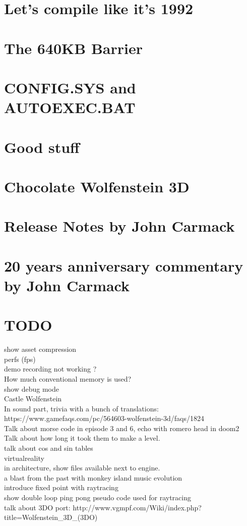\documentclass[8pt]{book}
\begin{document}
    \chapter{Let's compile like it's 1992}
    \chapter{The 640KB Barrier}\label{chap:barrier640}
        
    \chapter{CONFIG.SYS and AUTOEXEC.BAT}
         
    \chapter{Good stuff}
          
    \chapter{Chocolate Wolfenstein 3D}
    \chapter{Release Notes by John Carmack}
        
    \chapter{20 years anniversary commentary by John Carmack}
        
    
    
    \chapter{TODO}
    
    show asset compression\\
    perfs (fps)\\
demo recording not working ?\\
How much conventional memory is used?\\
show debug mode\\
Castle Wolfenstein\\
In sound part, trivia with a bunch of translations: https://www.gamefaqs.com/pc/564603-wolfenstein-3d/faqs/1824\\
Talk about morse code in episode 3 and 6, echo with romero head in doom2\\
Talk about how long it took them to make a level.\\
talk about cos and sin tables\\
virtualreality\\
in architecture, show files available next to engine.\\
a blast from the past with monkey island music evolution\\
introduce fixed point with raytracing\\
show double loop ping pong pseudo code used for raytracing\\
talk about 3DO port: http://www.vgmpf.com/Wiki/index.php?title=Wolfenstein\_3D\_(3DO)
\end{document}
